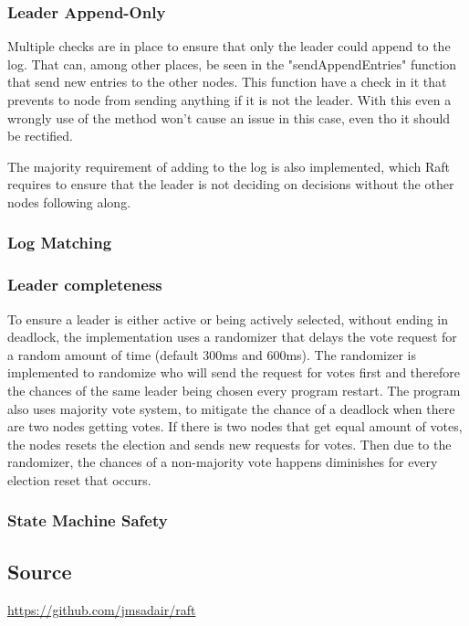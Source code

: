\documentclass[a4paper,11pt]{article}
\begin{document}
\subsubsection*{Leader Append-Only}
Multiple checks are in place to ensure that only the leader could append to the log.
That can, among other places, be seen in the "sendAppendEntries" function that send new entries to the other nodes.
This function have a check in it that prevents to node from sending anything if it is not the leader.
With this even a wrongly use of the method won't cause an issue in this case, even tho it should be rectified.

The majority requirement of adding to the log is also implemented, 
which Raft requires to ensure that the leader is not deciding on decisions without the other nodes following along.

\subsubsection*{Log Matching}

\subsubsection*{Leader completeness}
To ensure a leader is either active or being actively selected, without ending in deadlock, the implementation uses a randomizer that delays the vote request for a random amount of time (default 300ms and 600ms).
The randomizer is implemented to randomize who will send the request for votes first and therefore the chances of the same leader being chosen every program restart. The program also uses majority vote system,
to mitigate the chance of a deadlock when there are two nodes getting votes. If there is two nodes that get equal amount of votes, the nodes resets the election and sends new requests for votes.
Then due to the randomizer, the chances of a non-majority vote happens diminishes for every election reset that occurs.

\subsubsection*{State Machine Safety}

\subsection*{Source}
\href{https://github.com/jmsadair/raft}{https://github.com/jmsadair/raft}
\end{document}

